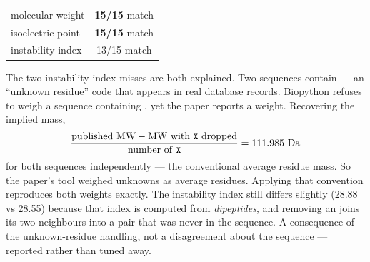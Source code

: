 \begin{center}
\small
\begin{tabular}{lc}
\toprule
molecular weight & \textbf{15/15} match \\
isoelectric point & \textbf{15/15} match \\
instability index & 13/15 match \\
\bottomrule
\end{tabular}
\end{center}

The two instability-index misses are both explained. Two sequences contain
 --- an ``unknown residue'' code that appears in real database records.
Biopython refuses to weigh a sequence containing , yet the paper
reports a weight. Recovering the implied mass,
\[
  \frac{\text{published MW} - \text{MW with \texttt{\small X} dropped}}{\text{number of \texttt{\small X}}}
  = 111.985 \text{ Da}
\]
for both sequences independently --- the conventional average residue mass. So
the paper's tool weighed unknowns as average residues. Applying that convention
reproduces both weights exactly. The instability index still differs slightly
(28.88 vs 28.55) because that index is computed from \emph{dipeptides}, and
removing an  joins its two neighbours into a pair that was never in the
sequence. A consequence of the unknown-residue handling, not a disagreement
about the sequence --- reported rather than tuned away.
